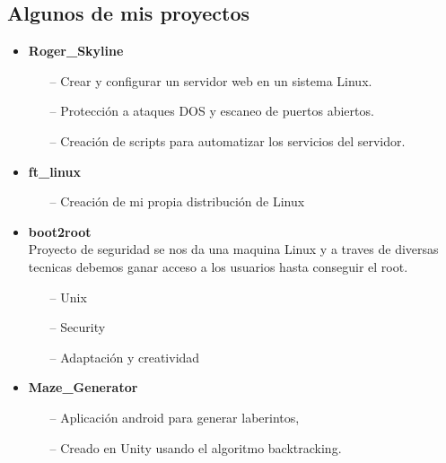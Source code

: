 \documentclass[11pt, oneside, a4paper, titlepage]{article}
\begin{document}
\newpage
{}
\begin{tcolorbox}[breakable,
				title={Adriano Ruiz Barbero \hfill Desarrollador de Software}]
				\section{Algunos de mis proyectos}
				\begin{itemize}
				\item
				{
					\textbf{Roger\_Skyline}
					\begin{enumerate}
						\item[--] Crear y configurar un servidor web en un sistema Linux.
						\item[--] Protección a ataques DOS y escaneo de puertos abiertos.
						\item[--] Creación de scripts para automatizar los servicios del servidor.
					\end{enumerate}
				}
				\item
				{
					\textbf{ft\_linux}
					\begin{enumerate}
						\item[--] Creación de mi propia distribución de Linux
					\end{enumerate}
				}
				\item
				{
					\textbf{boot2root} \\
					Proyecto de seguridad se nos da una maquina
					Linux y a traves de diversas tecnicas debemos
					ganar acceso a los usuarios hasta conseguir el
					root.
					\begin{enumerate}
						\item[--] Unix 
						\item[--] Security
						\item[--] Adaptación y creatividad
					\end{enumerate}
				}
				\item
				{
					\textbf{Maze\_Generator} \\
					\begin{enumerate}
						\item[--]Aplicación android para
							generar laberintos, 
						\item[--]Creado en Unity usando el algoritmo
							backtracking.

					\end{enumerate}
				}
				\end{itemize}
\end{tcolorbox}
\end{document}
